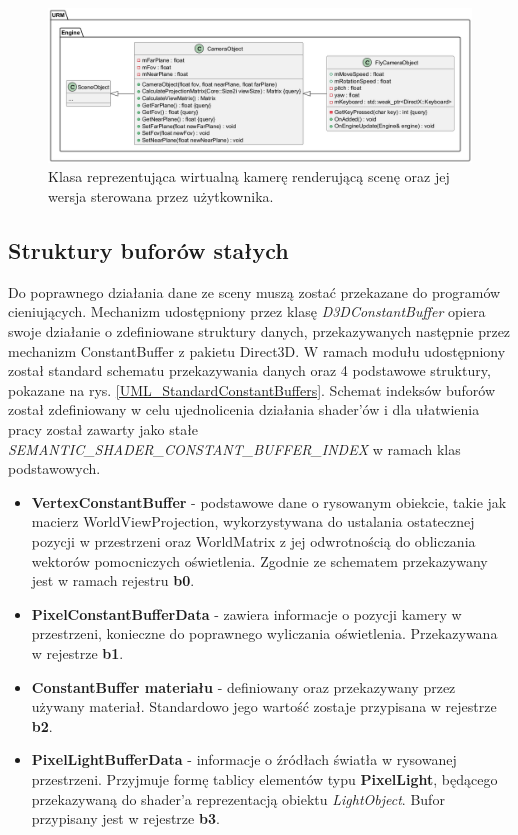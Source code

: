 	\begin{figure}[h!]
		\centering
		\includegraphics[width=\textwidth]{images/UML/sceneobjects_camera.png}
		\caption{Klasa reprezentująca wirtualną kamerę renderującą scenę oraz jej wersja sterowana przez użytkownika.}
		\label{UML_SceneObjects_Camera}
	\end{figure}
	
\subsection{Struktury buforów stałych}
	Do poprawnego działania dane ze sceny muszą zostać przekazane do programów cieniujących. Mechanizm udostępniony przez klasę \textit{D3DConstantBuffer} opiera swoje działanie o zdefiniowane struktury danych, przekazywanych następnie przez mechanizm ConstantBuffer z pakietu Direct3D. W ramach modułu udostępniony został standard schematu przekazywania danych oraz 4 podstawowe struktury, pokazane na rys. \ref{UML_StandardConstantBuffers}. Schemat indeksów buforów został zdefiniowany w celu ujednolicenia działania shader'ów i dla ułatwienia pracy został zawarty jako stałe \textit{SEMANTIC\_SHADER\_CONSTANT\_BUFFER\_INDEX} w ramach klas podstawowych.
	\begin{itemize}
		\item \textbf{VertexConstantBuffer} - podstawowe dane o rysowanym obiekcie, takie jak macierz WorldViewProjection, wykorzystywana do ustalania ostatecznej pozycji w przestrzeni oraz  WorldMatrix z jej odwrotnością do obliczania wektorów pomocniczych oświetlenia. Zgodnie ze schematem przekazywany jest w ramach rejestru \textbf{b0}.
		\item \textbf{PixelConstantBufferData} - zawiera informacje o pozycji kamery w przestrzeni, konieczne do poprawnego wyliczania oświetlenia. Przekazywana w rejestrze \textbf{b1}.
		\item \textbf{ConstantBuffer materiału} - definiowany oraz przekazywany przez używany materiał. Standardowo jego wartość zostaje przypisana w rejestrze \textbf{b2}.
		\item \textbf{PixelLightBufferData} - informacje o źródłach światła w rysowanej przestrzeni. Przyjmuje formę tablicy elementów typu \textbf{PixelLight}, będącego przekazywaną do shader'a reprezentacją obiektu \textit{LightObject}. Bufor przypisany jest w rejestrze \textbf{b3}.
	\end{itemize}
	
